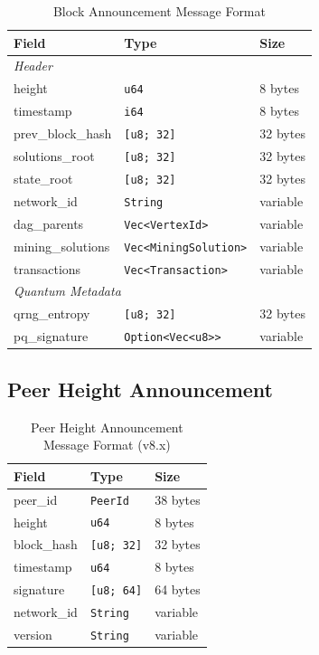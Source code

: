 \documentclass[11pt,a4paper]{article}
\begin{document}
\begin{table}[H]
\centering
\begin{tabular}{lll}
\toprule
\textbf{Field} & \textbf{Type} & \textbf{Size} \\
\midrule
\multicolumn{3}{l}{\textit{Header}} \\
height & \texttt{u64} & 8 bytes \\
timestamp & \texttt{i64} & 8 bytes \\
prev\_block\_hash & \texttt{[u8; 32]} & 32 bytes \\
solutions\_root & \texttt{[u8; 32]} & 32 bytes \\
state\_root & \texttt{[u8; 32]} & 32 bytes \\
network\_id & \texttt{String} & variable \\
\midrule
dag\_parents & \texttt{Vec<VertexId>} & variable \\
mining\_solutions & \texttt{Vec<MiningSolution>} & variable \\
transactions & \texttt{Vec<Transaction>} & variable \\
\midrule
\multicolumn{3}{l}{\textit{Quantum Metadata}} \\
qrng\_entropy & \texttt{[u8; 32]} & 32 bytes \\
pq\_signature & \texttt{Option<Vec<u8>>} & variable \\
\bottomrule
\end{tabular}
\caption{Block Announcement Message Format}
\end{table}

\subsection{Peer Height Announcement}

\begin{table}[H]
\centering
\begin{tabular}{lll}
\toprule
\textbf{Field} & \textbf{Type} & \textbf{Size} \\
\midrule
peer\_id & \texttt{PeerId} & 38 bytes \\
height & \texttt{u64} & 8 bytes \\
block\_hash & \texttt{[u8; 32]} & 32 bytes \\
timestamp & \texttt{u64} & 8 bytes \\
signature & \texttt{[u8; 64]} & 64 bytes \\
network\_id & \texttt{String} & variable \\
version & \texttt{String} & variable \\
\bottomrule
\end{tabular}
\caption{Peer Height Announcement Message Format (v8.x)}
\end{table}
\end{document}
